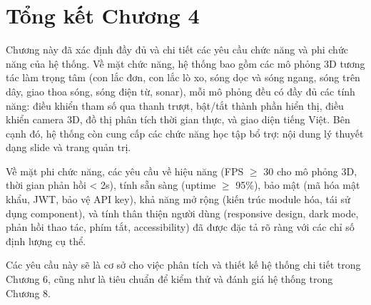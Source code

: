 \section{Tổng kết Chương 4}

Chương này đã xác định đầy đủ và chi tiết các yêu cầu chức năng và phi chức năng của hệ thống. Về mặt chức năng, hệ thống bao gồm các mô phỏng 3D tương tác làm trọng tâm (con lắc đơn, con lắc lò xo, sóng dọc và sóng ngang, sóng trên dây, giao thoa sóng, sóng điện từ, sonar), mỗi mô phỏng đều có đầy đủ các tính năng: điều khiển tham số qua thanh trượt, bật/tắt thành phần hiển thị, điều khiển camera 3D, đồ thị phân tích thời gian thực, và giao diện tiếng Việt. Bên cạnh đó, hệ thống còn cung cấp các chức năng học tập bổ trợ: nội dung lý thuyết dạng slide và trang quản trị.

Về mặt phi chức năng, các yêu cầu về hiệu năng (FPS $\geq$ 30 cho mô phỏng 3D, thời gian phản hồi < 2s), tính sẵn sàng (uptime $\geq$ 95\%), bảo mật (mã hóa mật khẩu, JWT, bảo vệ API key), khả năng mở rộng (kiến trúc module hóa, tái sử dụng component), và tính thân thiện người dùng (responsive design, dark mode, phản hồi thao tác, phím tắt, accessibility) đã được đặc tả rõ ràng với các chỉ số định lượng cụ thể.

Các yêu cầu này sẽ là cơ sở cho việc phân tích và thiết kế hệ thống chi tiết trong Chương 6, cũng như là tiêu chuẩn để kiểm thử và đánh giá hệ thống trong Chương 8.